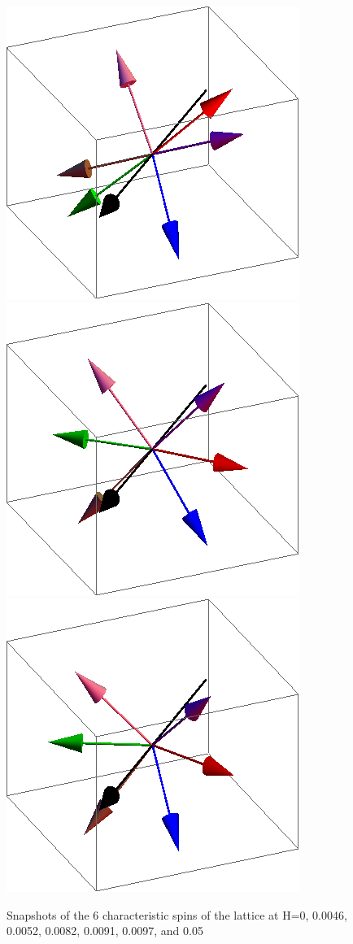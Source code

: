 \documentclass{article}
\begin{document}
\begin{figure}[ht]
\includegraphics[scale=0.3]{110/86S000to005G.png}
\includegraphics[scale=0.3]{110/96S000to005G.png}
\includegraphics[scale=0.3]{110/501S000to005G.png}
\caption{Snapshots of the 6 characteristic spins of the lattice at H=0, 0.0046, 0.0052, 0.0082, 0.0091, 0.0097, and 0.05}
\end{figure}
\clearpage
\end{document}
